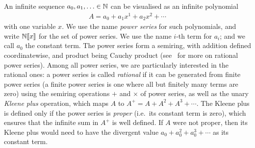 An infinite sequence $a_0,a_1,\ldots \in \mathbb N$ can be visualised as an infinite polynomial
\begin{align*}
 A = a_0 + a_1x^1 + a_2x^2 + \cdots
\end{align*}
with one variable $x$.
We use the name \emph{power series} for such polynomials, and write $\mathbb N [\![x]\!]$ for the set of power series. 
We use the name $i$-th term for $a_i$; and we call $a_0$ the constant term.   The power series form a semiring, with addition defined coordinatewise, and product being Cauchy product (see~\cite[part III]{sakarovitch2009elements} for more on rational power series). Among all power series, we are particularly interested in the rational ones: a power series is called \emph{rational} if it can be generated from finite power series (a finite power series is one where all but finitely many terms are zero) using the semiring operations $+$ and $\times$ of power series, as well as the  unary  \emph{Kleene plus} operation, which maps $A$ to $A^+ = A + A^2 + A^3 + \cdots$.
The Kleene plus is defined only if the power series is  \emph{proper} (i.e.~its constant term is zero), which ensures that the infinite sum in $A^+$ is well defined. If $A$ were not proper, then its Kleene plus would need to have the divergent value $a_0 + a_0^2 + a_0^3 + \cdots$ as its constant term.


